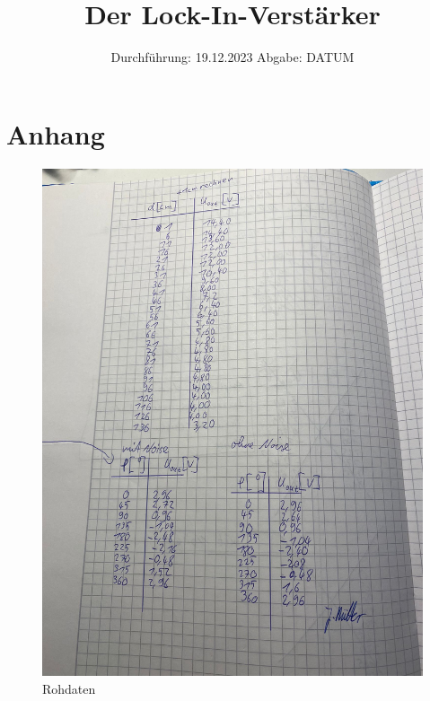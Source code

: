 

\subject{V303}
\title{Der Lock-In-Verstärker}
\date{%
  Durchführung: 19.12.2023
  \hspace{3em}
  Abgabe: DATUM
}



\maketitle
\thispagestyle{empty}
\tableofcontents
\newpage






\printbibliography{}

\section{Anhang}
\begin{figure}[H]
  \caption{Rohdaten}
  \includegraphics[width=\textwidth]{Bilder/data.jpg}
\end{figure}


